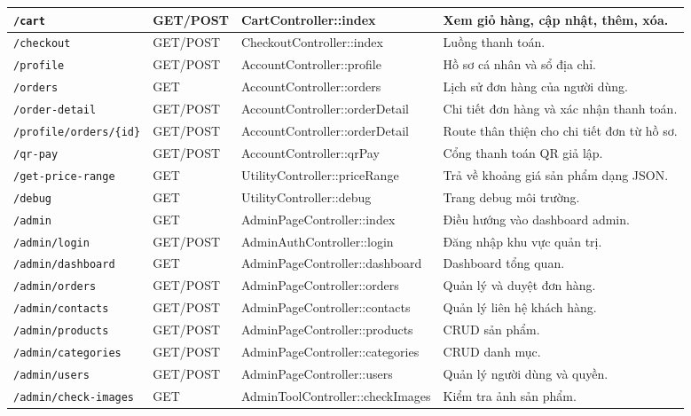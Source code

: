 \documentclass[11pt, a4paper]{article}
\begin{document}
\begin{longtable}{|p{3.0cm}|p{1.8cm}|p{4.0cm}|p{3.8cm}|}
    \texttt{/cart} & GET/POST & CartController::index & Xem giỏ hàng, cập nhật, thêm, xóa. \\ \hline
    \texttt{/checkout} & GET/POST & CheckoutController::index & Luồng thanh toán. \\ \hline
    \texttt{/profile} & GET/POST & AccountController::profile & Hồ sơ cá nhân và sổ địa chỉ. \\ \hline
    \texttt{/orders} & GET & AccountController::orders & Lịch sử đơn hàng của người dùng. \\ \hline
    \texttt{/order-detail} & GET/POST & AccountController::orderDetail & Chi tiết đơn hàng và xác nhận thanh toán. \\ \hline
    \texttt{/profile/orders/\{id\}} & GET/POST & AccountController::orderDetail & Route thân thiện cho chi tiết đơn từ hồ sơ. \\ \hline
    \texttt{/qr-pay} & GET/POST & AccountController::qrPay & Cổng thanh toán QR giả lập. \\ \hline
    \texttt{/get-price-range} & GET & UtilityController::priceRange & Trả về khoảng giá sản phẩm dạng JSON. \\ \hline
    \texttt{/debug} & GET & UtilityController::debug & Trang debug môi trường. \\ \hline
    \texttt{/admin} & GET & AdminPageController::index & Điều hướng vào dashboard admin. \\ \hline
    \texttt{/admin/login} & GET/POST & AdminAuthController::login & Đăng nhập khu vực quản trị. \\ \hline
    \texttt{/admin/dashboard} & GET & AdminPageController::dashboard & Dashboard tổng quan. \\ \hline
    \texttt{/admin/orders} & GET/POST & AdminPageController::orders & Quản lý và duyệt đơn hàng. \\ \hline
    \texttt{/admin/contacts} & GET/POST & AdminPageController::contacts & Quản lý liên hệ khách hàng. \\ \hline
    \texttt{/admin/products} & GET/POST & AdminPageController::products & CRUD sản phẩm. \\ \hline
    \texttt{/admin/categories} & GET/POST & AdminPageController::categories & CRUD danh mục. \\ \hline
    \texttt{/admin/users} & GET/POST & AdminPageController::users & Quản lý người dùng và quyền. \\ \hline
    \texttt{/admin/check-images} & GET & AdminToolController::checkImages & Kiểm tra ảnh sản phẩm. \\ \hline

\end{longtable}
\end{document}
